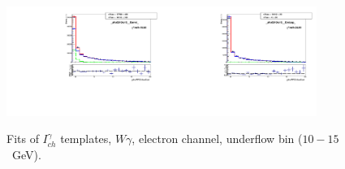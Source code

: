 \begin{figure}[htb]
  \begin{center}
   \includegraphics[width=0.45\textwidth]{../figs/figs_v11/ELECTRON_WGamma/TemplateFits/c_TEMPL_CHISO_UNblind__phoEt10to15__Barrel__RooFit.pdf}\includegraphics[width=0.45\textwidth]{../figs/figs_v11/ELECTRON_WGamma/TemplateFits/c_TEMPL_CHISO_UNblind__phoEt10to15__Endcap__RooFit.pdf}\\
  \label{fig:templateFits_CHISO_ELECTRON_0}
  \caption{Fits of $I_{ch}^{\gamma}$ templates, $W\gamma$, electron channel, underflow bin ($10-15$~GeV).}
  \end{center}
\end{figure}

